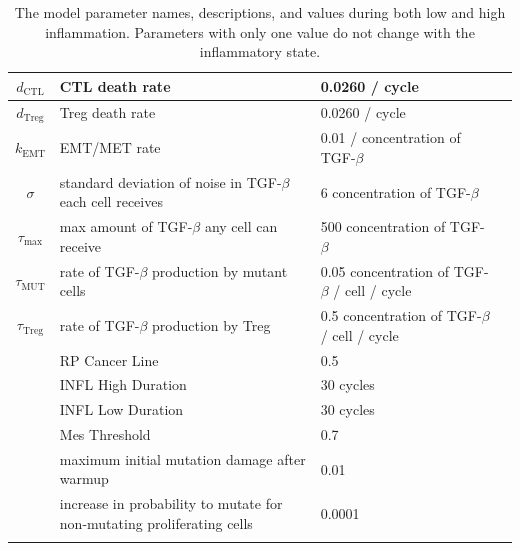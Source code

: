 \documentclass[11pt, a4paper, preprint]{article}
\begin{document}
\begin{longtable}{| c | p{5cm} | m{3cm} | m{3cm} |}
  \hline
  $d_\text{CTL}$ & CTL death rate & 0.0260 / cycle& \\ 
  \hline
  $d_\text{Treg}$ & Treg death rate & 0.0260 / cycle& \\ 
  \hline
  $k_\text{EMT}$ & EMT/MET rate & 0.01 / concentration of TGF-$\beta$ & \\
  \hline
  $\sigma$ & standard deviation of noise in TGF-$\beta$ each cell receives & 6 concentration of TGF-$\beta$ & \\
  \hline
 $\tau_\text{max}$ & max amount of TGF-$\beta$ any cell can receive & 500 concentration of TGF-$\beta$ &\\
  \hline 
 $\tau_\text{MUT}$ & rate of TGF-$\beta$ production by mutant cells & 0.05 concentration of TGF-$\beta$ / cell / cycle& \\
  \hline
 $\tau_\text{Treg}$ & rate of TGF-$\beta$ production by Treg & 0.5 concentration of TGF-$\beta$ / cell / cycle& \\
  \hline
  & RP Cancer Line  & 0.5 &  \\ 
 \hline
&  INFL High Duration & 30 cycles&   \\
 \hline
 & INFL Low Duration &30 cycles&   \\
 \hline
& Mes Threshold & 0.7 &    \\
 \hline
  & maximum initial mutation damage after warmup  & 0.01 &\\
  \hline
  & increase in probability to mutate for non-mutating proliferating cells & 0.0001 & \\
  \hline
  \caption{The model parameter names, descriptions, and values during both low and high inflammation. Parameters with only one value do not change with the inflammatory state.}
\end{longtable}
\end{document}

